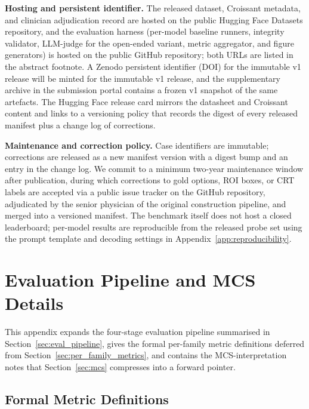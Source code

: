 \documentclass{article}
\begin{document}
\textbf{Hosting and persistent identifier.} The released dataset, Croissant metadata, and clinician adjudication record are hosted on the public Hugging Face Datasets repository, and the evaluation harness (per-model baseline runners, integrity validator, LLM-judge for the open-ended variant, metric aggregator, and figure generators) is hosted on the public GitHub repository; both URLs are listed in the abstract footnote. A Zenodo persistent identifier (DOI) for the immutable v1 release will be minted for the immutable v1 release, and the supplementary archive in the submission portal contains a frozen v1 snapshot of the same artefacts. The Hugging Face release card mirrors the datasheet and Croissant content and links to a versioning policy that records the digest of every released manifest plus a change log of corrections.

\textbf{Maintenance and correction policy.} Case identifiers are immutable; corrections are released as a new manifest version with a digest bump and an entry in the change log. We commit to a minimum two-year maintenance window after publication, during which corrections to gold options, ROI boxes, or CRT labels are accepted via a public issue tracker on the GitHub repository, adjudicated by the senior physician of the original construction pipeline, and merged into a versioned manifest. The benchmark itself does not host a closed leaderboard; per-model results are reproducible from the released probe set using the prompt template and decoding settings in Appendix~\ref{app:reproducibility}.

\section{Evaluation Pipeline and MCS Details}
\label{app:eval_pipeline_detail}

This appendix expands the four-stage evaluation pipeline summarised in Section~\ref{sec:eval_pipeline}, gives the formal per-family metric definitions deferred from Section~\ref{sec:per_family_metrics}, and contains the MCS-interpretation notes that Section~\ref{sec:mcs} compresses into a forward pointer.

\subsection{Formal Metric Definitions}
\label{app:metric_formulas}
\end{document}
